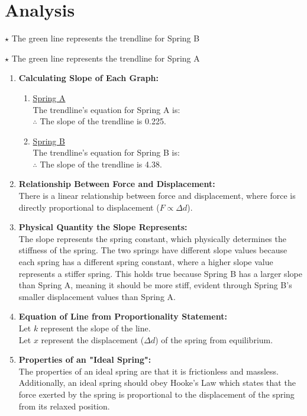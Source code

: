 \documentclass[12pt,letterpaper]{article}
\begin{document}
\section{Analysis}
\vspace{-4mm}

\vspace{-8mm}
$\star$ The green line represents the trendline for Spring B

\vspace{-8mm}
$\star$ The green line represents the trendline for Spring A
\begin{enumerate}[font=\bfseries]
	\item \textbf{Calculating Slope of Each Graph:}
	      \vspace{-4mm}
	      \begin{enumerate}
		      \item \underline{Spring A}\\
		            The trendline's equation for Spring A is:~\\
		            $\therefore$ The slope of the trendline is 0.225.
		      \item \underline{Spring B}\\
		            The trendline's equation for Spring B is:~\\
		            $\therefore$ The slope of the trendline is 4.38.
	      \end{enumerate}
	      \newpage
	\item \textbf{Relationship Between Force and Displacement:}\\
	      There is a linear relationship between force and displacement, where force is directly proportional to displacement ($F \propto \Delta d$).
	\item \textbf{Physical Quantity the Slope Represents:}\\
	      The slope represents the spring constant, which physically determines the stiffness of the spring.
	      The two springs have different slope values because each spring has a different spring constant, where a higher slope value represents a stiffer spring.
	      This holds true because Spring B has a larger slope than Spring A, meaning it should be more stiff, evident through Spring B's smaller displacement values than Spring A.
	\item \textbf{Equation of Line from Proportionality Statement:}\\
	      Let $k$ represent the slope of the line.\\
	      Let $x$ represent the displacement ($\Delta d$) of the spring from equilibrium.\\
	\item \textbf{Properties of an "Ideal Spring":}\\
	      The properties of an ideal spring are that it is frictionless and massless.
	      Additionally, an ideal spring should obey Hooke's Law which states that the force exerted by the spring is proportional to the displacement of the spring from its relaxed position.
\end{enumerate}
\end{document}
